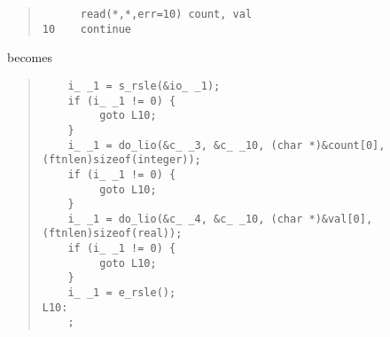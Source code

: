 \documentclass[10pt,a4paper]{article}
\begin{document}
\begin{quote}
\begin{verbatim}
      read(*,*,err=10) count, val
10    continue
\end{verbatim}
\end{quote}
becomes
\begin{quote}
\begin{verbatim}
    i_ _1 = s_rsle(&io_ _1);
    if (i_ _1 != 0) {
         goto L10;
    }
    i_ _1 = do_lio(&c_ _3, &c_ _10, (char *)&count[0], (ftnlen)sizeof(integer));
    if (i_ _1 != 0) {
         goto L10;
    }
    i_ _1 = do_lio(&c_ _4, &c_ _10, (char *)&val[0], (ftnlen)sizeof(real));
    if (i_ _1 != 0) {
         goto L10;
    }
    i_ _1 = e_rsle();
L10:
    ;
\end{verbatim}
\end{quote}
\end{document}
